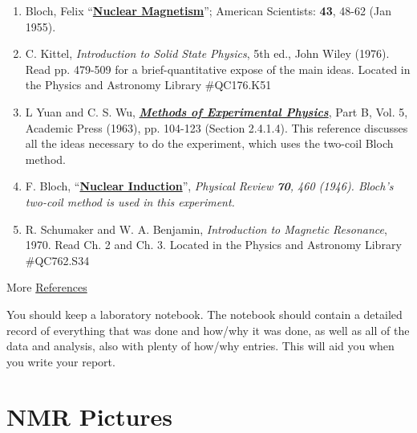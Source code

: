 \documentclass{../lab}
\begin{document}
\begin{enumerate}
    \item Bloch, Felix ``\href{http://physics111.lib.berkeley.edu/Physics111/Reprints/NMR/02-Nuclear\_Magnetism.pdf}{\textbf{Nuclear Magnetism}}''; American Scientists: \textbf{43}, 48-62 (Jan 1955).

    \item C. Kittel, \emph{Introduction to Solid State Physics}, 5th ed., John Wiley (1976). Read pp. 479-509 for a brief-quantitative expose of the main ideas. Located in the Physics and Astronomy Library \#QC176.K51

    \item L Yuan and C. S. Wu, \emph{\href{http://physics111.lib.berkeley.edu/Physics111/Reprints/NMR/01-Methods\_of\_Experimental\_Physics.pdf}{\textbf{Methods of Experimental Physics}}}, Part B, Vol. 5, Academic Press (1963), pp. 104-123 (Section 2.4.1.4). This reference discusses all the ideas necessary to do the experiment, which uses the two-coil Bloch method.

    \item F. Bloch, ``\href{http://physics111.lib.berkeley.edu/Physics111/Reprints/NMR/03-Nuclear_Induction.pdf}{\textbf{Nuclear Induction}}'', \emph{Physical Review \textbf{70}, 460 (1946). Bloch's two-coil method is used in this experiment. }

    \item R. Schumaker and W. A. Benjamin, \emph{Introduction to Magnetic Resonance}, 1970. Read Ch. 2 and Ch. 3. Located in the Physics and Astronomy Library \#QC762.S34
\end{enumerate}

More \hyperref[References]{References}

You should keep a laboratory notebook. The notebook should contain a detailed record of everything that was done and how/why it was done, as well as all of the data and analysis, also with plenty of how/why entries. This will aid you when you write your report.

\section{NMR Pictures}
\end{document}
